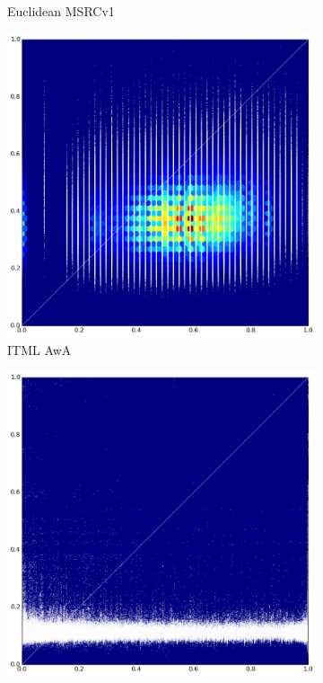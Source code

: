 \begin{figure}[p]
\begin{subfigure}{.5\textwidth}
  \caption{Euclidean MSRCv1}
  \label{fig:sub2}
\end{subfigure}
\begin{subfigure}{.5\textwidth}
  \centering
  \includegraphics[width=\textwidth]{Figures/ITML_test_AwA}
  \caption{ITML AwA}
  \label{fig:sub3}
\end{subfigure}%
\begin{subfigure}{.5\textwidth}
  \centering
  \includegraphics[width=\textwidth]{Figures/ITML_test_MSRCv1}

\end{subfigure}
\end{figure}
